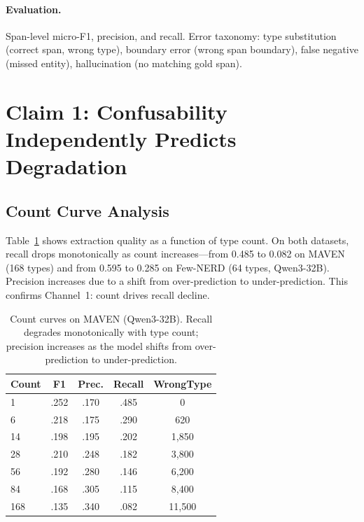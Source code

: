 \documentclass[11pt,a4paper]{article}
\begin{document}
\paragraph{Evaluation.}
Span-level micro-F1, precision, and recall. Error taxonomy: type substitution (correct span, wrong type), boundary error (wrong span boundary), false negative (missed entity), hallucination (no matching gold span).

\section{Claim 1: Confusability Independently Predicts Degradation}
\label{sec:claim1}

\subsection{Count Curve Analysis}

Table~\ref{tab:count_curve} shows extraction quality as a function of type count. On both datasets, recall drops monotonically as count increases---from 0.485 to 0.082 on MAVEN (168 types) and from 0.595 to 0.285 on Few-NERD (64 types, Qwen3-32B). Precision increases due to a shift from over-prediction to under-prediction. This confirms Channel~1: count drives recall decline.

\begin{table}[t]
\centering
\small
\caption{Count curves on MAVEN (Qwen3-32B). Recall degrades monotonically with type count; precision increases as the model shifts from over-prediction to under-prediction.}
\label{tab:count_curve}
\begin{tabular}{lcccc}
\toprule
Count & F1 & Prec. & Recall & WrongType \\
\midrule
1   & .252 & .170 & .485 & 0 \\
6   & .218 & .175 & .290 & 620 \\
14  & .198 & .195 & .202 & 1,850 \\
28  & .210 & .248 & .182 & 3,800 \\
56  & .192 & .280 & .146 & 6,200 \\
84  & .168 & .305 & .115 & 8,400 \\
168 & .135 & .340 & .082 & 11,500 \\
\bottomrule
\end{tabular}
\end{table}
\end{document}
